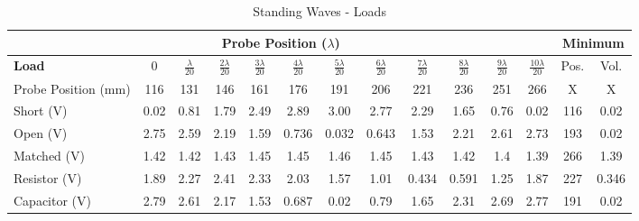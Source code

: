 \documentclass{article}
\begin{document}
\begin{table}[h]
	\begin{tabular}{|l|c|c|c|c|c|c|c|c|c|c|c|c|c|}
	\hline
	\multicolumn{12}{|c|}{\textbf{Probe Position ($\lambda$)}}                                                               	& \multicolumn{2}{c|}{\textbf{Minimum}} \\ \hline
	\textbf{Load}       & 0    & $\frac{\lambda}{20}$    & $\frac{2\lambda}{20}$    & $\frac{3\lambda}{20}$    & $\frac{4\lambda}{20}$     & $\frac{5\lambda}{20}$     & $\frac{6\lambda}{20}$     & $\frac{7\lambda}{20}$    & $\frac{8\lambda}{20}$    & $\frac{9\lambda}{20}$    & $\frac{10\lambda}{20}$   & Pos.         & Vol.          \\ \hline
	Probe Position (mm) & 116  & 131  & 146  & 161  & 176   & 191   & 206   & 221  & 236  & 251  & 266  & X            & X             \\ \hline
	Short (V)           & 0.02 & 0.81 & 1.79 & 2.49 & 2.89  & 3.00  & 2.77  & 2.29 & 1.65 & 0.76 & 0.02 & 116          & 0.02          \\ \hline
	Open (V)            & 2.75 & 2.59 & 2.19 & 1.59 & 0.736 & 0.032 & 0.643 & 1.53 & 2.21 & 2.61 & 2.73 & 193          & 0.02          \\ \hline
	Matched (V)         & 1.42 & 1.42 & 1.43 & 1.45 & 1.45  & 1.46  & 1.45  & 1.43 & 1.42 & 1.4  & 1.39 & 266          & 1.39          \\ \hline
	Resistor (V)        & 1.89 & 2.27 & 2.41 & 2.33 & 2.03  & 1.57  & 1.01  & 0.434& 0.591& 1.25 & 1.87 & 227          & 0.346         \\ \hline
	Capacitor (V)       & 2.79 & 2.61 & 2.17 & 1.53 & 0.687 & 0.02  & 0.79  & 1.65 & 2.31 & 2.69 & 2.77 & 191          & 0.02          \\ \hline
	\end{tabular}
	\caption{Standing Waves - Loads}
	\label{}
\end{table}
\end{document}
